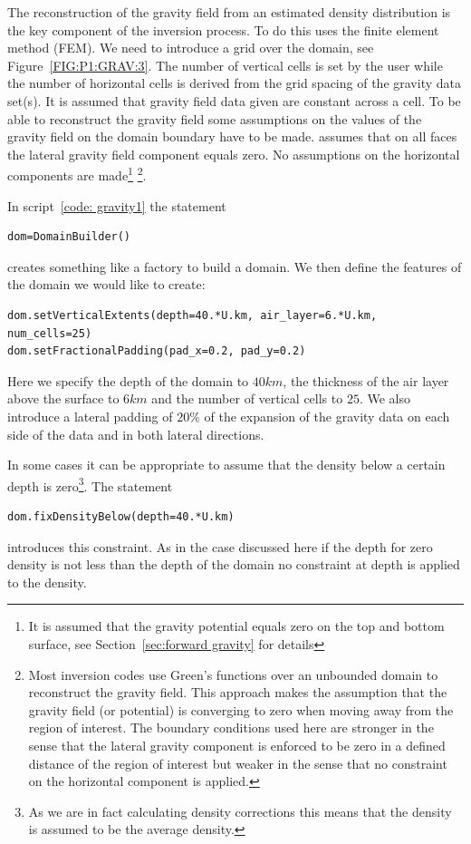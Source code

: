 The reconstruction of the gravity field from an estimated density distribution
is the key component of the inversion process.
To do this \downunder uses the finite element method (FEM).
We need to introduce a grid over the domain, see Figure~\ref{FIG:P1:GRAV:3}.
The number of vertical cells is set by the user while the number of horizontal
cells is derived from the grid spacing of the gravity data set(s).
It is assumed that gravity field data given are constant across a cell.
To be able to reconstruct the gravity field some assumptions on the values of
the gravity field on the domain boundary have to be made.
\downunder assumes that on all faces the lateral gravity field component
equals zero. No assumptions on the horizontal components are
made\footnote{It is assumed that the gravity potential equals zero on the top
and bottom surface, see Section~\ref{sec:forward gravity} for details}%
\footnote{Most inversion codes use Green's functions over an unbounded domain
to reconstruct the gravity field. This approach makes the assumption that the
gravity field (or potential) is converging to zero when moving away from the
region of interest. The boundary conditions used here are stronger in the
sense that the lateral gravity component is enforced to be zero in a defined
distance of the region of interest but weaker in the sense that no constraint
on the horizontal component is applied.}.
   
In script~\ref{code: gravity1} the statement
\begin{verbatim}
dom=DomainBuilder()
\end{verbatim}
creates something like a factory to build a domain.
We then define the features of the domain we would like to create:
\begin{verbatim}
dom.setVerticalExtents(depth=40.*U.km, air_layer=6.*U.km, num_cells=25)
dom.setFractionalPadding(pad_x=0.2, pad_y=0.2)
\end{verbatim}
Here we specify the depth of the domain to $40 km$, the thickness of the air
layer above the surface to $6 km$ and the number of vertical cells to $25$.
We also introduce a lateral padding of $20 \%$ of the expansion of the gravity
data on each side of the data and in both lateral directions.

In some cases it can be appropriate to assume that the density below a certain
depth is zero\footnote{As we are in fact calculating density corrections this
means that the density is assumed to be the average density.}.
The statement 
\begin{verbatim}
dom.fixDensityBelow(depth=40.*U.km)
\end{verbatim}
introduces this constraint.
As in the case discussed here if the depth for zero density is not less than
the depth of the domain no constraint at depth is applied to the density.

